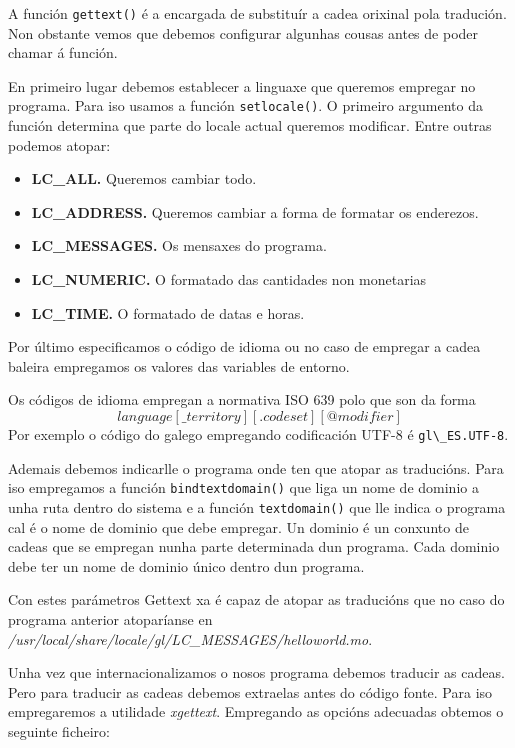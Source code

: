 A función \lstinline{gettext()} é a encargada de substituír a cadea orixinal pola tradución. Non obstante vemos que debemos configurar algunhas cousas antes de poder chamar á función.

En primeiro lugar debemos establecer a linguaxe que queremos empregar no programa. Para iso usamos a función \lstinline{setlocale()}. O primeiro argumento da función determina que parte do locale actual queremos modificar. Entre outras podemos atopar:

\begin{itemize}
    \item \textbf{LC\_ALL.} Queremos cambiar todo.
    \item \textbf{LC\_ADDRESS.} Queremos cambiar a forma de formatar os enderezos.
    \item \textbf{LC\_MESSAGES.} Os mensaxes do programa.
    \item \textbf{LC\_NUMERIC.} O formatado das cantidades non monetarias
    \item \textbf{LC\_TIME.} O formatado de datas e horas.
\end{itemize}

Por último especificamos o código de idioma ou no caso de empregar a cadea baleira empregamos os valores das variables de entorno.

Os códigos de idioma empregan a normativa ISO 639 polo que son da forma $$language[\_territory][.codeset][@modifier]$$ Por exemplo o código do galego empregando codificación UTF-8 é \lstinline{gl\_ES.UTF-8}.

Ademais debemos indicarlle o programa onde ten que atopar as traducións. Para iso empregamos a función \lstinline{bindtextdomain()} que liga un nome de dominio a unha ruta dentro do sistema e a función \lstinline{textdomain()} que lle indica o programa cal é o nome de dominio que debe empregar. Un dominio é un conxunto de cadeas que se empregan nunha parte determinada dun programa. Cada dominio debe ter un nome de dominio único dentro dun programa.

Con estes parámetros Gettext xa é capaz de atopar as traducións que no caso do programa anterior atoparíanse en \emph{/usr/local/share/locale/gl/LC\_MESSAGES/helloworld.mo}.

Unha vez que internacionalizamos o nosos programa debemos traducir as cadeas. Pero para traducir as cadeas debemos extraelas antes do código fonte. Para iso empregaremos a utilidade \emph{xgettext}. Empregando as opcións adecuadas obtemos o seguinte ficheiro:

